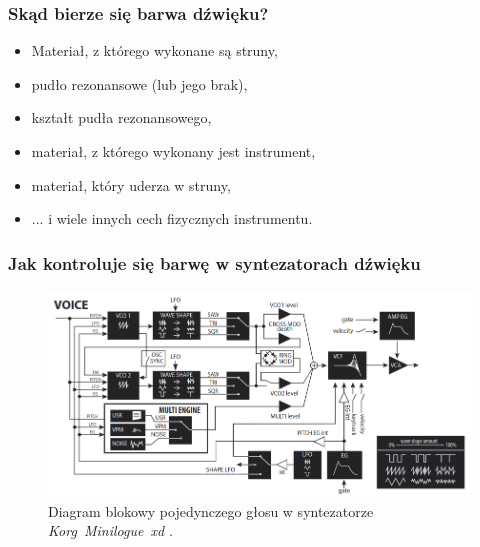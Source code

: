 \documentclass[]{beamer}
\begin{document}
\begin{frame}
  \frametitle{Skąd bierze się barwa dźwięku?}
  \begin{itemize}
    \item Materiał, z którego wykonane są struny,
    \item pudło rezonansowe (lub jego brak),
    \item kształt pudła rezonansowego,
    \item materiał, z którego wykonany jest instrument,
    \item materiał, który uderza w struny,
    \item ... i wiele innych cech fizycznych instrumentu.
  \end{itemize}
\end{frame}


\begin{frame}
  \frametitle{Jak kontroluje się barwę w syntezatorach dźwięku}

  \begin{figure}
    \centering
    \includegraphics[width=0.9\linewidth]{minilogue_voice_block_diagram.png}

    \caption{
      Diagram blokowy pojedynczego głosu w syntezatorze 
      \textit{Korg~Minilogue~xd} \cite{minilogue_diagram}.
    }
  \end{figure}
\end{frame}
\end{document}

